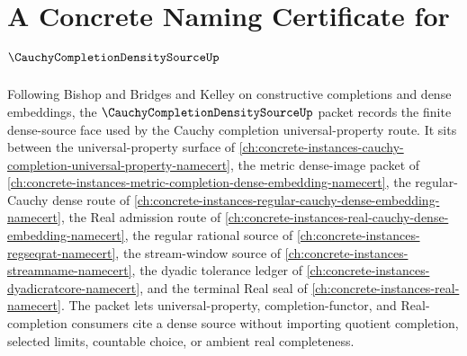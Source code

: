 \chapter{A Concrete Naming Certificate for $\CauchyCompletionDensitySourceUp$}
\label{ch:concrete-instances-cauchy-completion-density-source-namecert}

Following Bishop and Bridges and Kelley on constructive completions and dense embeddings, the $\CauchyCompletionDensitySourceUp$ packet records the finite dense-source face used by the Cauchy completion universal-property route. It sits between the universal-property surface of \autoref{ch:concrete-instances-cauchy-completion-universal-property-namecert}, the metric dense-image packet of \autoref{ch:concrete-instances-metric-completion-dense-embedding-namecert}, the regular-Cauchy dense route of \autoref{ch:concrete-instances-regular-cauchy-dense-embedding-namecert}, the Real admission route of \autoref{ch:concrete-instances-real-cauchy-dense-embedding-namecert}, the regular rational source of \autoref{ch:concrete-instances-regseqrat-namecert}, the stream-window source of \autoref{ch:concrete-instances-streamname-namecert}, the dyadic tolerance ledger of \autoref{ch:concrete-instances-dyadicratcore-namecert}, and the terminal Real seal of \autoref{ch:concrete-instances-real-namecert}. The packet lets universal-property, completion-functor, and Real-completion consumers cite a dense source without importing quotient completion, selected limits, countable choice, or ambient real completeness.

